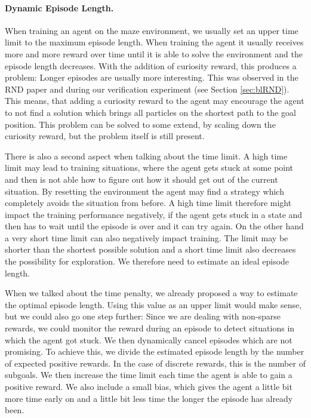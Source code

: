 \paragraph{Dynamic Episode Length.}
When training an agent on the maze environment, we usually set an upper time limit to the maximum episode length. When training the agent it usually receives more and more reward over time until it is able to solve the environment and the episode length decreases. With the addition of curiosity reward, this produces a problem: Longer episodes are usually more interesting. This was observed in the RND paper \cite{burda2018exploration} and during our verification experiment (see Section \ref{sec:blRND}). This means, that adding a curiosity reward to the agent may encourage the agent to not find a solution which brings all particles on the shortest path to the goal position. This problem can be solved to some extend, by scaling down the curiosity reward, but the problem itself is still present. 

There is also a second aspect when talking about the time limit. A high time limit may lead to training situations, where the agent gets stuck at some point and then is not able how to figure out how it should get out of the current situation. By resetting the environment the agent may find a strategy which completely avoids the situation from before. A high time limit therefore might impact the training performance negatively, if the agent gets stuck in a state and then has to wait until the episode is over and it can try again. On the other hand a very short time limit can also negatively impact training. The limit may be shorter than the shortest possible solution and a short time limit also decreases the possibility for exploration. We therefore need to estimate an ideal episode length. 

When we talked about the time penalty, we already proposed a way to estimate the optimal episode length. Using this value as an upper limit would make sense, but we could also go one step further: Since we are dealing with non-sparse rewards, we could monitor the reward during an episode to detect situations in which the agent got stuck. We then dynamically cancel episodes which are not promising. To achieve this, we divide the estimated episode length by the number of expected positive rewards. In the case of discrete rewards, this is the number of subgoals. We then increase the time limit each time the agent is able to gain a positive reward. We also include a small bias, which gives the agent a little bit more time early on and a little bit less time the longer the episode has already been.

